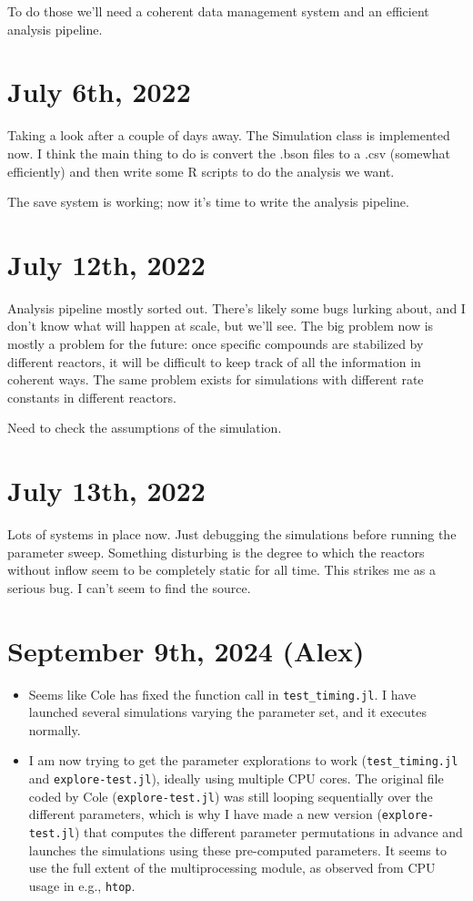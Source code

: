 \documentclass[11pt]{book}
\begin{document}
To do those we'll need a coherent data management system and an efficient analysis pipeline.

\section{July 6th, 2022}

Taking a look after a couple of days away. The Simulation class is implemented now. I think the main thing to do is convert the .bson files to a .csv (somewhat efficiently) and then write some R scripts to do the analysis we want.

The save system is working; now it's time to write the analysis pipeline.

\section{July 12th, 2022}

Analysis pipeline mostly sorted out. There's likely some bugs lurking about, and I don't know what will happen at scale, but we'll see. The big problem now is mostly a problem for the future: once specific compounds are stabilized by different reactors, it will be difficult to keep track of all the information in coherent ways. The same problem exists for simulations with different rate constants in different reactors.

Need to check the assumptions of the simulation.

\section{July 13th, 2022}

Lots of systems in place now. Just debugging the simulations before running the parameter sweep. Something disturbing is the degree to which the reactors without inflow seem to be completely static for all time. This strikes me as a serious bug. I can't seem to find the source.

\section{September 9th, 2024 (Alex)}

\begin{itemize}
    \item Seems like Cole has fixed the function call in \texttt{test\_timing.jl}. I have launched several simulations varying the parameter set, and it executes normally.
    \item I am now trying to get the parameter explorations to work (\texttt{test\_timing.jl} and \texttt{explore-test.jl}), ideally using multiple CPU cores. The original file coded by Cole (\texttt{explore-test.jl}) was still looping sequentially over the different parameters, which is why I have made a new version (\texttt{explore-test.jl}) that computes the different parameter permutations in advance and launches the simulations using these pre-computed parameters. It seems to use the full extent of the multiprocessing module, as observed from CPU usage in e.g., \texttt{htop}.
\end{itemize}
\end{document}
